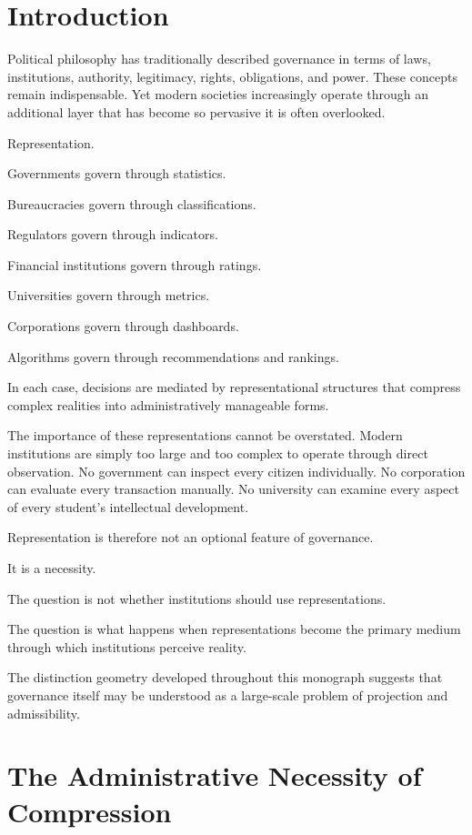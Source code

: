 \documentclass[11pt,oneside,openany]{book}
\begin{document}
\section{Introduction}

Political philosophy has traditionally described governance in terms of laws, institutions, authority, legitimacy, rights, obligations, and power. These concepts remain indispensable. Yet modern societies increasingly operate through an additional layer that has become so pervasive it is often overlooked.

Representation.

Governments govern through statistics.

Bureaucracies govern through classifications.

Regulators govern through indicators.

Financial institutions govern through ratings.

Universities govern through metrics.

Corporations govern through dashboards.

Algorithms govern through recommendations and rankings.

In each case, decisions are mediated by representational structures that compress complex realities into administratively manageable forms.

The importance of these representations cannot be overstated. Modern institutions are simply too large and too complex to operate through direct observation. No government can inspect every citizen individually. No corporation can evaluate every transaction manually. No university can examine every aspect of every student's intellectual development.

Representation is therefore not an optional feature of governance.

It is a necessity.

The question is not whether institutions should use representations.

The question is what happens when representations become the primary medium through which institutions perceive reality.

The distinction geometry developed throughout this monograph suggests that governance itself may be understood as a large-scale problem of projection and admissibility.

\section{The Administrative Necessity of Compression}
\end{document}
